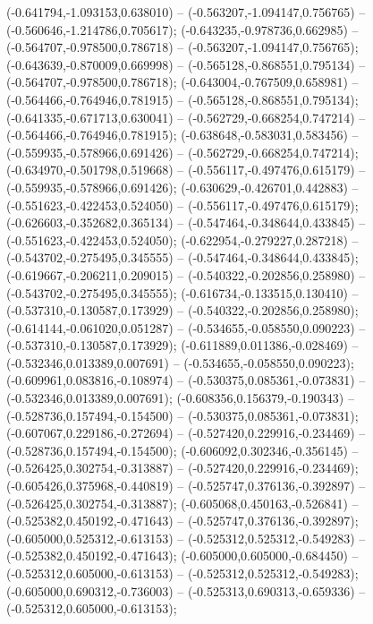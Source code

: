  (-0.641794,-1.093153,0.638010) -- (-0.563207,-1.094147,0.756765) -- (-0.560646,-1.214786,0.705617);
 (-0.643235,-0.978736,0.662985) -- (-0.564707,-0.978500,0.786718) -- (-0.563207,-1.094147,0.756765);
 (-0.643639,-0.870009,0.669998) -- (-0.565128,-0.868551,0.795134) -- (-0.564707,-0.978500,0.786718);
 (-0.643004,-0.767509,0.658981) -- (-0.564466,-0.764946,0.781915) -- (-0.565128,-0.868551,0.795134);
 (-0.641335,-0.671713,0.630041) -- (-0.562729,-0.668254,0.747214) -- (-0.564466,-0.764946,0.781915);
 (-0.638648,-0.583031,0.583456) -- (-0.559935,-0.578966,0.691426) -- (-0.562729,-0.668254,0.747214);
 (-0.634970,-0.501798,0.519668) -- (-0.556117,-0.497476,0.615179) -- (-0.559935,-0.578966,0.691426);
 (-0.630629,-0.426701,0.442883) -- (-0.551623,-0.422453,0.524050) -- (-0.556117,-0.497476,0.615179);
 (-0.626603,-0.352682,0.365134) -- (-0.547464,-0.348644,0.433845) -- (-0.551623,-0.422453,0.524050);
 (-0.622954,-0.279227,0.287218) -- (-0.543702,-0.275495,0.345555) -- (-0.547464,-0.348644,0.433845);
 (-0.619667,-0.206211,0.209015) -- (-0.540322,-0.202856,0.258980) -- (-0.543702,-0.275495,0.345555);
 (-0.616734,-0.133515,0.130410) -- (-0.537310,-0.130587,0.173929) -- (-0.540322,-0.202856,0.258980);
 (-0.614144,-0.061020,0.051287) -- (-0.534655,-0.058550,0.090223) -- (-0.537310,-0.130587,0.173929);
 (-0.611889,0.011386,-0.028469) -- (-0.532346,0.013389,0.007691) -- (-0.534655,-0.058550,0.090223);
 (-0.609961,0.083816,-0.108974) -- (-0.530375,0.085361,-0.073831) -- (-0.532346,0.013389,0.007691);
 (-0.608356,0.156379,-0.190343) -- (-0.528736,0.157494,-0.154500) -- (-0.530375,0.085361,-0.073831);
 (-0.607067,0.229186,-0.272694) -- (-0.527420,0.229916,-0.234469) -- (-0.528736,0.157494,-0.154500);
 (-0.606092,0.302346,-0.356145) -- (-0.526425,0.302754,-0.313887) -- (-0.527420,0.229916,-0.234469);
 (-0.605426,0.375968,-0.440819) -- (-0.525747,0.376136,-0.392897) -- (-0.526425,0.302754,-0.313887);
 (-0.605068,0.450163,-0.526841) -- (-0.525382,0.450192,-0.471643) -- (-0.525747,0.376136,-0.392897);
 (-0.605000,0.525312,-0.613153) -- (-0.525312,0.525312,-0.549283) -- (-0.525382,0.450192,-0.471643);
 (-0.605000,0.605000,-0.684450) -- (-0.525312,0.605000,-0.613153) -- (-0.525312,0.525312,-0.549283);
 (-0.605000,0.690312,-0.736003) -- (-0.525313,0.690313,-0.659336) -- (-0.525312,0.605000,-0.613153);
